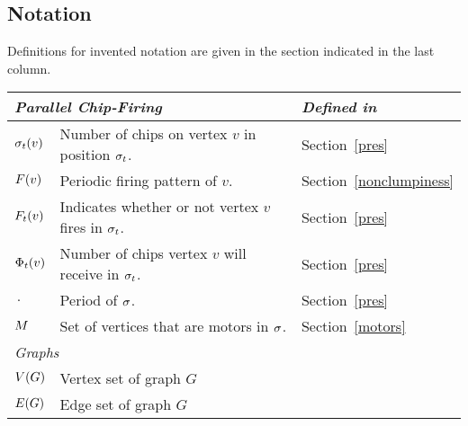 \subsection*{Notation}
\newlength{\tablespace}
\setlength{\tablespace}{.3\baselineskip}
Definitions for invented notation are given in the section indicated in the
last column.\\

\showgame
\begin{centering}
  \begin{tabular}{l p{} l}
    \toprule
    \multicolumn{2}{l}{\emph{Parallel Chip-Firing}} & \emph{Defined in} \\
    \midrule

    $\chips{v}{t}$ & Number of chips on vertex $v$ in position $\pos{t}$. &
    Section~\ref{pres} \vspace{\tablespace}\\

    $\pfp{v}$ & Periodic firing pattern of $v$. & Section~\ref{nonclumpiness}
    \vspace{\tablespace}\\

    $\firing{v}{t}$ & Indicates whether or not vertex $v$ fires in $\pos{t}$. &
    Section~\ref{pres} \vspace{\tablespace}\\

    $\receiving{v}{t}$ & Number of chips vertex $v$ will receive in $\pos{t}$.
    & Section~\ref{pres} \vspace{\tablespace}\\

    $\period$ & Period of $\s$. & Section~\ref{pres} \vspace{\tablespace}\\

    $\mots$ & Set of vertices that are motors in $\s$. & Section~\ref{motors}
    \vspace{\tablespace}\\

    \toprule
    \multicolumn{3}{l}{\emph{Graphs}} \\
    \midrule

    $\V$ & \multicolumn{2}{l}{Vertex set of graph $G$} \vspace{\tablespace}\\

    $\E$ & \multicolumn{2}{l}{Edge set of graph $G$} \vspace{\tablespace}\\


\end{tabular}
\end{centering}
